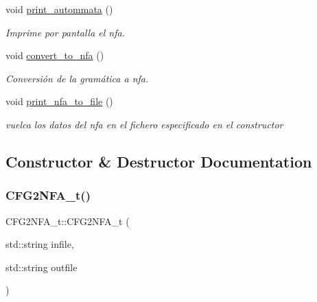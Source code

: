 \begin{DoxyCompactItemize}
void \hyperlink{classCFG2NFA__t_a53c3f07450d5ceb2152ecb7e6c93316e}{print\+\_\+autommata} ()
\begin{DoxyCompactList}\small\item\em Imprime por pantalla el nfa. \end{DoxyCompactList}\item 
\mbox{\label{classCFG2NFA__t_ac91999afca843193662a58ebd5269618}} 
void \hyperlink{classCFG2NFA__t_ac91999afca843193662a58ebd5269618}{convert\+\_\+to\+\_\+nfa} ()
\begin{DoxyCompactList}\small\item\em Conversión de la gramática a nfa. \end{DoxyCompactList}\item 
\mbox{\label{classCFG2NFA__t_aec9ee342fcd79d845e7772d9e649240b}} 
void \hyperlink{classCFG2NFA__t_aec9ee342fcd79d845e7772d9e649240b}{print\+\_\+nfa\+\_\+to\+\_\+file} ()
\begin{DoxyCompactList}\small\item\em vuelca los datos del nfa en el fichero especificado en el constructor \end{DoxyCompactList}\end{DoxyCompactItemize}


\subsection{Constructor \& Destructor Documentation}
\mbox{\label{classCFG2NFA__t_a5601f12afa0cad50ca41a1a9fdfb05cc}} 
\subsubsection{\texorpdfstring{C\+F\+G2\+N\+F\+A\+\_\+t()}{CFG2NFA\_t()}}
{\footnotesize\ttfamily C\+F\+G2\+N\+F\+A\+\_\+t\+::\+C\+F\+G2\+N\+F\+A\+\_\+t (\begin{DoxyParamCaption}\item[{std\+::string}]{infile,  }\item[{std\+::string}]{outfile }\end{DoxyParamCaption})}



